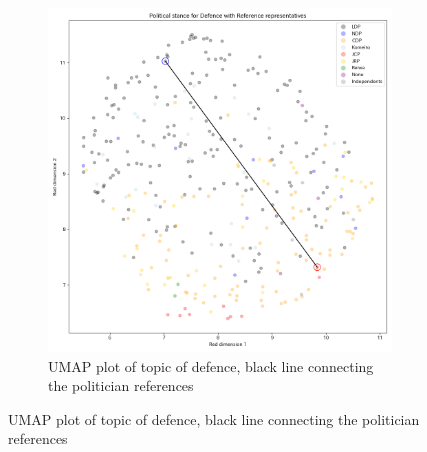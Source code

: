 \documentclass[final,5p,times,twocolumn,authoryear]{elsarticle}
\begin{document}
\begin{figure}[h]
\centering
    \begin{subfigure}{0.3\textwidth}
      \centering
      \includegraphics[width=1\linewidth]{figs/defence_umap_clean.png}
      \caption{UMAP plot of topic of defence, black line connecting the politician references}
      \label{fig:sub1}
    \end{subfigure}
    

\end{figure}
\end{document}
